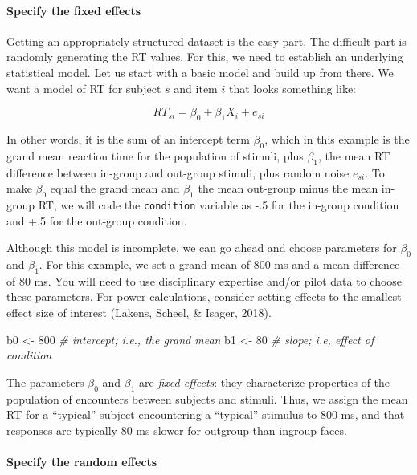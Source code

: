 \documentclass[man,floatsintext]{apa6}
\newenvironment{Shaded}{\begin{snugshade}}{\end{snugshade}}
\newcommand{\DecValTok}[1]{\textcolor[rgb]{0.00,0.00,0.81}{#1}}
\newcommand{\StringTok}[1]{\textcolor[rgb]{0.31,0.60,0.02}{#1}}
\newcommand{\CommentTok}[1]{\textcolor[rgb]{0.56,0.35,0.01}{\textit{#1}}}
\newcommand{\NormalTok}[1]{#1}
\let\oldparagraph\paragraph
\renewcommand{\paragraph}[1]{\oldparagraph{#1}\mbox{}}
\begin{document}
\paragraph{Specify the fixed effects}\label{specify-the-fixed-effects}

Getting an appropriately structured dataset is the easy part. The
difficult part is randomly generating the RT values. For this, we need
to establish an underlying statistical model. Let us start with a basic
model and build up from there. We want a model of RT for subject \(s\)
and item \(i\) that looks something like:

\[RT_{si} = \beta_0 + \beta_1 X_{i} + e_{si}\]

In other words, it is the sum of an intercept term \(\beta_0\), which in
this example is the grand mean reaction time for the population of
stimuli, plus \(\beta_1\), the mean RT difference between in-group and
out-group stimuli, plus random noise \(e_{si}\). To make \(\beta_0\)
equal the grand mean and \(\beta_1\) the mean out-group minus the mean
in-group RT, we will code the \texttt{condition} variable as -.5 for the
in-group condition and +.5 for the out-group condition.

Although this model is incomplete, we can go ahead and choose parameters
for \(\beta_0\) and \(\beta_1\). For this example, we set a grand mean
of 800 ms and a mean difference of 80 ms. You will need to use
disciplinary expertise and/or pilot data to choose these parameters. For
power calculations, consider setting effects to the smallest effect size
of interest (Lakens, Scheel, \& Isager, 2018).

\begin{Shaded}
\begin{Highlighting}[]
\NormalTok{b0 <-}\StringTok{ }\DecValTok{800} \CommentTok{# intercept; i.e., the grand mean}
\NormalTok{b1 <-}\StringTok{  }\DecValTok{80} \CommentTok{# slope; i.e, effect of condition}
\end{Highlighting}
\end{Shaded}

The parameters \(\beta_0\) and \(\beta_1\) are \emph{fixed effects}:
they characterize properties of the population of encounters between
subjects and stimuli. Thus, we assign the mean RT for a
\enquote{typical} subject encountering a \enquote{typical} stimulus to
800 ms, and that responses are typically 80 ms slower for outgroup than
ingroup faces.

\paragraph{Specify the random effects}\label{specify-the-random-effects}
\end{document}
